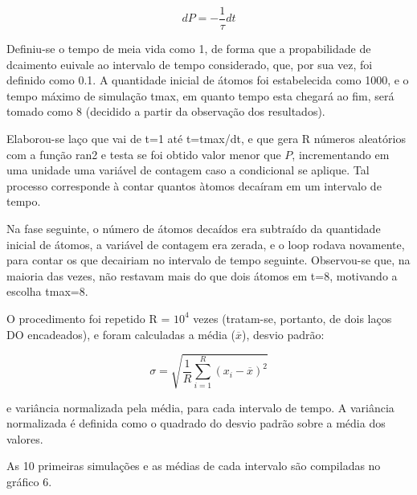 \documentclass{article}
\begin{document}
\begin{equation}
  \label{eq:prob}
  dP=-\frac{1}{\tau}dt
\end{equation}

Definiu-se o tempo de meia vida como 1, de forma que a propabilidade de dcaimento euivale ao intervalo de tempo considerado, que, por sua vez, foi definido como 0.1. A quantidade inicial de átomos foi estabelecida como 1000, e o tempo máximo de simulação tmax, em quanto tempo esta chegará ao fim, será tomado como 8 (decidido a partir da observação dos resultados).\par
Elaborou-se laço que vai de t=1 até t=tmax/dt, e que gera R números aleatórios com a função ran2 e testa se foi obtido valor menor que $P$, incrementando em uma unidade uma variável de contagem caso a condicional se aplique. Tal processo corresponde à contar quantos àtomos decaíram em um intervalo de tempo.\par
Na fase seguinte, o número de átomos decaídos era subtraído da quantidade inicial de átomos, a variável de contagem era zerada, e o loop rodava novamente, para contar os que decairiam no intervalo de tempo seguinte. Observou-se que, na maioria das vezes, não restavam mais do que dois átomos em t=8, motivando a escolha tmax=8.\par
O procedimento foi repetido R = $10^4$ vezes (tratam-se, portanto, de dois laços DO encadeados), e foram calculadas a média ($\overline{x}$), desvio padrão:

\[\sigma =\sqrt{ \frac{1}{R} \sum_{i=1}^R (x_i - \overline{x})^2}\]

 e variância normalizada pela média, para cada intervalo de tempo. A variância normalizada é definida como o quadrado do desvio padrão sobre a média dos valores.\par
As 10 primeiras simulações e as médias de cada intervalo são compiladas no gráfico 6.
\end{document}
